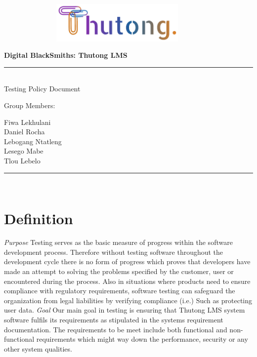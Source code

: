 \documentclass[12pt,a4paper]{article}
\begin{document}
	\begin{titlepage}
		\begin{figure}[t]
			\includegraphics[scale=0.5, height=2cm, width=10cm]{ThutongLogo.png}
		\end{figure}
		\centering
		\textbf{\LARGE Digital BlackSmiths: Thutong LMS}
		\newline
		\rule{\textwidth}{1.6pt}\\[\baselineskip]
		Testing Policy Document
		
		\vspace*{0.5cm}
		
		\large Group Members: \vspace*{0.3cm}
		
			{Fiwa Lekhulani\\Daniel Rocha\\Lebogang Ntatleng\\Lesego Mabe\\Tlou Lebelo}
		
		\rule{\textwidth}{1.6pt}\\[\baselineskip]
		
		
		\vspace*{\fill}
	\end{titlepage}
	
	\pagebreak
	\section*{Definition}
		 \textit{Purpose} \newline
		 Testing serves as the basic measure of progress within the software development process. Therefore without testing software throughout the development cycle there is no form of progress which proves that developers have made an attempt to solving the problems specified by the customer, user or encountered during the process. \newline 
Also in situations where products need to ensure compliance with regulatory requirements, software testing can safeguard the organization from legal liabilities by verifying compliance  {\footnotesize (i.e.) Such as protecting user data.}
	\newline
	\newline
	\textit{Goal} \newline
	 Our main goal in testing is ensuring that Thutong LMS system software fulfils its requirements as stipulated in the systems requirement documentation.
The requirements to be meet include both functional and non-functional requirements which might way down the performance, security or any other system qualities.
\end{document}
